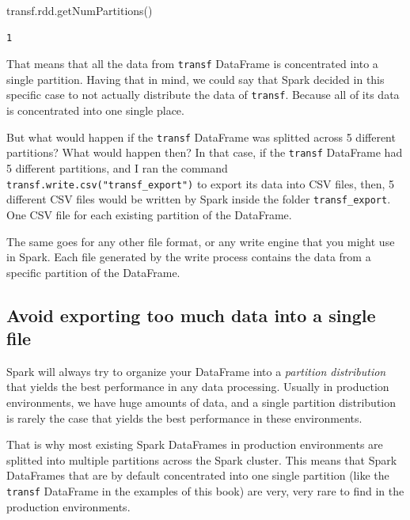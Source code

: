 \documentclass[
  11pt,
  letterpaper,
  DIV=11,
  numbers=noendperiod]{scrreprt}
\newenvironment{Shaded}{\begin{snugshade}}{\end{snugshade}}
\newcommand{\NormalTok}[1]{\textcolor[rgb]{0.00,0.23,0.31}{#1}}
\begin{document}
\begin{Shaded}
\begin{Highlighting}[]
\NormalTok{transf.rdd.getNumPartitions()}
\end{Highlighting}
\end{Shaded}

\begin{verbatim}
1
\end{verbatim}

That means that all the data from \texttt{transf} DataFrame is
concentrated into a single partition. Having that in mind, we could say
that Spark decided in this specific case to not actually distribute the
data of \texttt{transf}. Because all of its data is concentrated into
one single place.

But what would happen if the \texttt{transf} DataFrame was splitted
across 5 different partitions? What would happen then? In that case, if
the \texttt{transf} DataFrame had 5 different partitions, and I ran the
command \texttt{transf.write.csv("transf\_export")} to export its data
into CSV files, then, 5 different CSV files would be written by Spark
inside the folder \texttt{transf\_export}. One CSV file for each
existing partition of the DataFrame.

The same goes for any other file format, or any write engine that you
might use in Spark. Each file generated by the write process contains
the data from a specific partition of the DataFrame.

\hypertarget{avoid-exporting-too-much-data-into-a-single-file}{%
\subsection{Avoid exporting too much data into a single
file}\label{avoid-exporting-too-much-data-into-a-single-file}}

Spark will always try to organize your DataFrame into a \emph{partition
distribution} that yields the best performance in any data processing.
Usually in production environments, we have huge amounts of data, and a
single partition distribution is rarely the case that yields the best
performance in these environments.

That is why most existing Spark DataFrames in production environments
are splitted into multiple partitions across the Spark cluster. This
means that Spark DataFrames that are by default concentrated into one
single partition (like the \texttt{transf} DataFrame in the examples of
this book) are very, very rare to find in the production environments.
\end{document}
